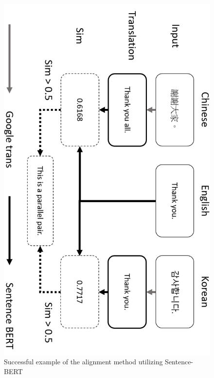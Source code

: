 \documentclass[PhD]{PHlab-thesis}
\begin{document}
\begin{figure}[h!]
  \centering
  \includegraphics[width=0.75\linewidth]{fig_3_4.jpg}
  \captionsetup{type=figure}
  \caption{Successful example of the alignment method utilizing Sentence-BERT}
  \label{fig:transcript}
\end{figure}
\end{document}
